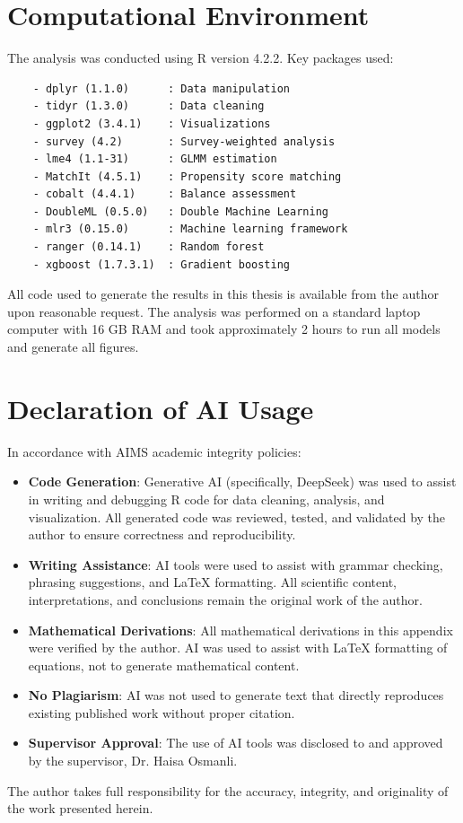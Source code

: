 \section{Computational Environment}

The analysis was conducted using R version 4.2.2. Key packages used:

\begin{verbatim}
	- dplyr (1.1.0)      : Data manipulation
	- tidyr (1.3.0)      : Data cleaning
	- ggplot2 (3.4.1)    : Visualizations
	- survey (4.2)       : Survey-weighted analysis
	- lme4 (1.1-31)      : GLMM estimation
	- MatchIt (4.5.1)    : Propensity score matching
	- cobalt (4.4.1)     : Balance assessment
	- DoubleML (0.5.0)   : Double Machine Learning
	- mlr3 (0.15.0)      : Machine learning framework
	- ranger (0.14.1)    : Random forest
	- xgboost (1.7.3.1)  : Gradient boosting
\end{verbatim}

All code used to generate the results in this thesis is available from the author upon reasonable request. The analysis was performed on a standard laptop computer with 16 GB RAM and took approximately 2 hours to run all models and generate all figures.

\section{Declaration of AI Usage}

In accordance with AIMS academic integrity policies:

\begin{itemize}
	\item \textbf{Code Generation}: Generative AI (specifically, DeepSeek) was used to assist in writing and debugging R code for data cleaning, analysis, and visualization. All generated code was reviewed, tested, and validated by the author to ensure correctness and reproducibility.
	
	\item \textbf{Writing Assistance}: AI tools were used to assist with grammar checking, phrasing suggestions, and LaTeX formatting. All scientific content, interpretations, and conclusions remain the original work of the author.
	
	\item \textbf{Mathematical Derivations}: All mathematical derivations in this appendix were verified by the author. AI was used to assist with LaTeX formatting of equations, not to generate mathematical content.
	
	\item \textbf{No Plagiarism}: AI was not used to generate text that directly reproduces existing published work without proper citation.
	
	\item \textbf{Supervisor Approval}: The use of AI tools was disclosed to and approved by the supervisor, Dr. Haisa Osmanli.
\end{itemize}

The author takes full responsibility for the accuracy, integrity, and originality of the work presented herein.